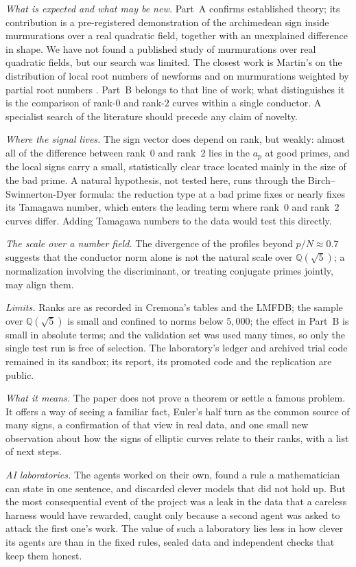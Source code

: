 \documentclass[11pt]{amsart}
\numberwithin{equation}{section}
\newcommand{\Q}{\mathbb{Q}}
\newcommand{\Kfield}{\Q(\sqrt{5})}
\begin{document}
\emph{What is expected and what may be new.} Part~A confirms established theory; its contribution is a pre-registered demonstration of the archimedean sign inside murmurations over a real quadratic field, together with an unexplained difference in shape. We have not found a published study of murmurations over real quadratic fields, but our search was limited. The closest work is Martin's on the distribution of local root numbers of newforms and on murmurations weighted by partial root numbers \cite{Martin2023,Martin2024,Martin2025}. Part~B belongs to that line of work; what distinguishes it is the comparison of rank-$0$ and rank-$2$ curves within a single conductor. A specialist search of the literature should precede any claim of novelty.

\emph{Where the signal lives.} The sign vector does depend on rank, but weakly: almost all of the difference between rank~$0$ and rank~$2$ lies in the $a_p$ at good primes, and the local signs carry a small, statistically clear trace located mainly in the size of the bad prime. A natural hypothesis, not tested here, runs through the Birch--Swinnerton-Dyer formula: the reduction type at a bad prime fixes or nearly fixes its Tamagawa number, which enters the leading term where rank~$0$ and rank~$2$ curves differ. Adding Tamagawa numbers to the data would test this directly.

\emph{The scale over a number field.} The divergence of the profiles beyond $p/N\approx0.7$ suggests that the conductor norm alone is not the natural scale over $\Kfield$; a normalization involving the discriminant, or treating conjugate primes jointly, may align them.

\emph{Limits.} Ranks are as recorded in Cremona's tables and the LMFDB; the sample over $\Kfield$ is small and confined to norms below $5{,}000$; the effect in Part~B is small in absolute terms; and the validation set was used many times, so only the single test run is free of selection. The laboratory's ledger and archived trial code remained in its sandbox; its report, its promoted code and the replication are public.

\emph{What it means.} The paper does not prove a theorem or settle a famous problem. It offers a way of seeing a familiar fact, Euler's half turn as the common source of many signs, a confirmation of that view in real data, and one small new observation about how the signs of elliptic curves relate to their ranks, with a list of next steps.

\emph{AI laboratories.} The agents worked on their own, found a rule a mathematician can state in one sentence, and discarded clever models that did not hold up. But the most consequential event of the project was a leak in the data that a careless harness would have rewarded, caught only because a second agent was asked to attack the first one's work. The value of such a laboratory lies less in how clever its agents are than in the fixed rules, sealed data and independent checks that keep them honest.
\end{document}

